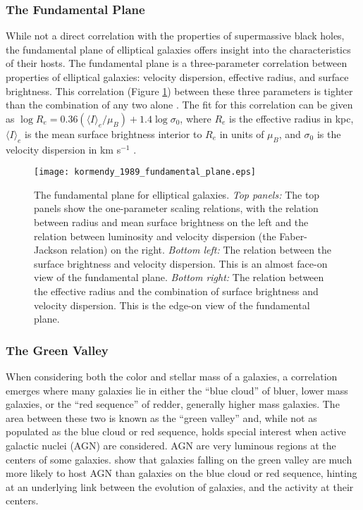 \subsubsection{The Fundamental Plane}

While not a direct correlation with the properties of supermassive black holes, the fundamental plane of elliptical galaxies offers insight into the characteristics of their hosts.  The fundamental plane is a three-parameter correlation between properties of elliptical galaxies:  velocity dispersion, effective radius, and surface brightness.  This correlation (Figure \ref{fig:fundamental_plane}) between these three parameters is tighter than the combination of any two alone \citep{djorgovski_1987}.  The fit for this correlation can be given as $\log R_{e} = 0.36(\langle I \rangle_{e} / \mu_{B}) + 1.4 \log \sigma_{0}$, where $R_{e}$ is the effective radius in kpc, $\langle I \rangle_{e}$ is the mean surface brightness interior to $R_{e}$ in units of $\mu_{B}$, and $\sigma_{0}$ is the velocity dispersion in km s$^{-1}$ \citep{binney_merrifield_1998}.

\begin{figure}[H]
\centering
\texttt{[image: kormendy\_1989\_fundamental\_plane.eps]}
\caption[The fundamental plane for elliptical galaxies]{\footnotesize The fundamental plane for elliptical galaxies.  \textit{Top panels:} The top panels show the one-parameter scaling relations, with the relation between radius and mean surface brightness on the left and the relation between luminosity and velocity dispersion (the Faber-Jackson relation) on the right.  \textit{Bottom left:} The relation between the surface brightness and velocity dispersion.  This is an almost face-on view of the fundamental plane.  \textit{Bottom right:} The relation between the effective radius and the combination of surface brightness and velocity dispersion.  This is the edge-on view of the fundamental plane.  \citep{kormendy_1989}}
\label{fig:fundamental_plane}
\end{figure}


\subsubsection{The Green Valley}

When considering both the color and stellar mass of a galaxies, a correlation emerges where many galaxies lie in either the ``blue cloud'' of bluer, lower mass galaxies, or the ``red sequence'' of redder, generally higher mass galaxies.  The area between these two is known as the ``green valley'' and, while not as populated as the blue cloud or red sequence, holds special interest when active galactic nuclei (AGN) are considered.  AGN are very luminous regions at the centers of some galaxies.  \citet{schawinski_2010} show that galaxies falling on the green valley are much more likely to host AGN than galaxies on the blue cloud or red sequence, hinting at an underlying link between the evolution of galaxies, and the activity at their centers.

